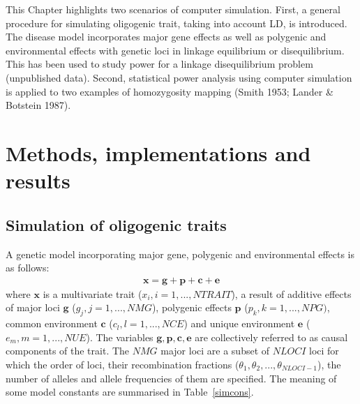 This Chapter highlights two scenarios of computer simulation.  First, a general
procedure for simulating oligogenic trait, taking into account LD, is
introduced.  The disease model incorporates major gene effects as well as
polygenic and environmental effects with genetic loci in linkage equilibrium or
disequilibrium.  This has been used to study power for a linkage disequilibrium
problem (unpublished data).  Second, statistical power analysis using computer
simulation is applied to two examples of homozygosity mapping (Smith 1953;
Lander \& Botstein 1987).


\section{Methods, implementations and results}

\subsection*{Simulation of oligogenic traits}

A genetic model incorporating major gene, polygenic and environmental effects
is as follows:
\begin{eqnarray}
\mathbf{x}=\mathbf{g}+\mathbf{p}+\mathbf{c}+\mathbf{e}
\end{eqnarray}
where $\mathbf{x}$ is a multivariate trait ($x_i,i=1,...,NTRAIT$), a result of
additive effects of major loci $\mathbf{g}$
 ($g_j,j=1,...,NMG$), polygenic effects $\mathbf{p}$
 ($p_k,k=1,...,NPG)$, common environment $\mathbf{c}$
 ($c_l,l=1,...,NCE$) and unique environment $\mathbf{e}$
 ($e_m,m=1,...,NUE$). The variables $\mathbf{g}, \mathbf{p}, \mathbf{c},
\mathbf{e}$ are collectively referred to as causal components of the trait.
The $NMG$ major loci are a subset of $NLOCI$ loci for which the order of loci,
their recombination fractions ($\theta_1,\theta_2,...,\theta_{NLOCI-1}$), the
number of alleles and allele frequencies of them are specified.  The meaning of
some model constants are summarised in Table~\ref{simcons}.

